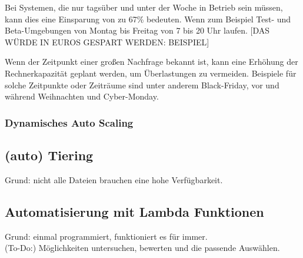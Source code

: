 Bei Systemen, die nur tagsüber und unter der Woche in Betrieb sein müssen, kann dies eine Einsparung von zu 67\% bedeuten.  Wenn zum Beispiel Test- und Beta-Umgebungen von Montag bis Freitag von 7 bis 20 Uhr laufen.
[DAS WÜRDE IN EUROS GESPART WERDEN: BEISPIEL]



Wenn der Zeitpunkt einer großen Nachfrage bekannt ist, kann eine Erhöhung der Rechnerkapazität geplant werden, um Überlastungen zu vermeiden.
Beispiele für solche Zeitpunkte oder Zeiträume sind unter anderem Black-Friday, vor und während Weihnachten und Cyber-Monday.
\subsubsection{Dynamisches Auto Scaling}

\subsection{(auto) Tiering }
Grund: nicht alle Dateien brauchen eine hohe Verfügbarkeit.

\subsection{Automatisierung mit Lambda Funktionen}
Grund: einmal programmiert, funktioniert es für immer.
\\(To-Do:) Möglichkeiten untersuchen, bewerten und die passende Auswählen.

